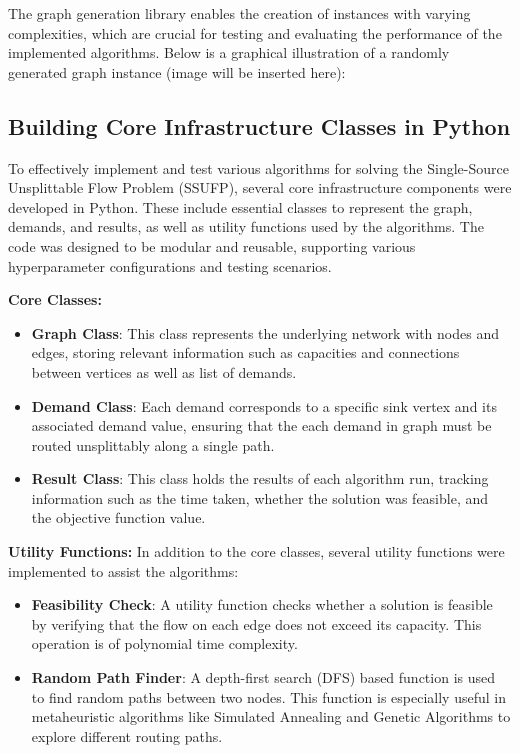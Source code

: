 \documentclass[a4paper,12pt]{article}
\begin{document}
\noindent The graph generation library enables the creation of instances with varying complexities, which are crucial for testing and evaluating the performance of the implemented algorithms. Below is a graphical illustration of a randomly generated graph instance (image will be inserted here):

\subsection{Building Core Infrastructure Classes in Python}

To effectively implement and test various algorithms for solving the Single-Source Unsplittable Flow Problem (SSUFP), several core infrastructure components were developed in Python. These include essential classes to represent the graph, demands, and results, as well as utility functions used by the algorithms. The code was designed to be modular and reusable, supporting various hyperparameter configurations and testing scenarios.

\noindent \textbf{Core Classes:}
\begin{itemize}
    \item \textbf{Graph Class}: This class represents the underlying network with nodes and edges, storing relevant information such as capacities and connections between vertices as well as list of demands.
    \item \textbf{Demand Class}: Each demand corresponds to a specific sink vertex and its associated demand value, ensuring that the each demand in graph must be routed unsplittably along a single path.
    \item \textbf{Result Class}: This class holds the results of each algorithm run, tracking information such as the time taken, whether the solution was feasible, and the objective function value.
\end{itemize}

\noindent \textbf{Utility Functions:}
In addition to the core classes, several utility functions were implemented to assist the algorithms:
\begin{itemize}
    \item \textbf{Feasibility Check}: A utility function checks whether a solution is feasible by verifying that the flow on each edge does not exceed its capacity. This operation is of polynomial time complexity.
    \item \textbf{Random Path Finder}: A depth-first search (DFS) based function is used to find random paths between two nodes. This function is especially useful in metaheuristic algorithms like Simulated Annealing and Genetic Algorithms to explore different routing paths.
\end{itemize}
\end{document}
